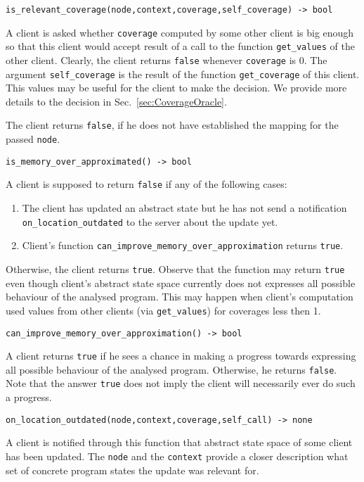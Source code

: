 \documentclass[envcountsame]{llncs}
\begin{document}
\noindent\texttt{is\_relevant\_coverage(node,context,coverage,self\_coverage) -> bool}

A client is asked whether \texttt{coverage} computed by some other client is big
enough so that this client would accept result of a call to the function
\texttt{get\_values} of the other client. Clearly, the client returns
\texttt{false} whenever \texttt{coverage} is 0. The argument
\texttt{self\_coverage} is the result of the function \texttt{get\_coverage} of
this client. This values may be useful for the client to make the decision. We
provide more details to the decision in Sec.~\ref{sec:CoverageOracle}.

The client returns \texttt{false}, if he does not have established the mapping
for the passed \texttt{node}.
\newline

\noindent\texttt{is\_memory\_over\_approximated() -> bool}

A client is supposed to return \texttt{false} if any of the following cases:
\begin{enumerate}
\item The client has updated an abstract state but he has not send a notification
\texttt{on\_location\_outdated} to the server about the update yet.
\item Client's function \texttt{can\_improve\_memory\_over\_approximation} returns \texttt{true}.
\end{enumerate}
Otherwise, the client returns \texttt{true}. Observe that the function may
return \texttt{true} even though client's abstract state space currently does
not expresses all possible behaviour of the analysed program. This may happen
when client's computation used values from other clients (via
\texttt{get\_values}) for coverages less then 1. \newline

\noindent\texttt{can\_improve\_memory\_over\_approximation() -> bool}

A client returns \texttt{true} if he sees a chance in making a progress
towards expressing all possible behaviour of the analysed program. Otherwise, he
returns \texttt{false}. Note that the answer \texttt{true} does not imply the
client will necessarily ever do such a progress. \newline

\noindent\texttt{on\_location\_outdated(node,context,coverage,self\_call) -> none}

A client is notified through this function that abstract state space of some
client has been updated. The \texttt{node} and the \texttt{context} provide a
closer description what set of concrete program states the update was relevant
for.
\end{document}
